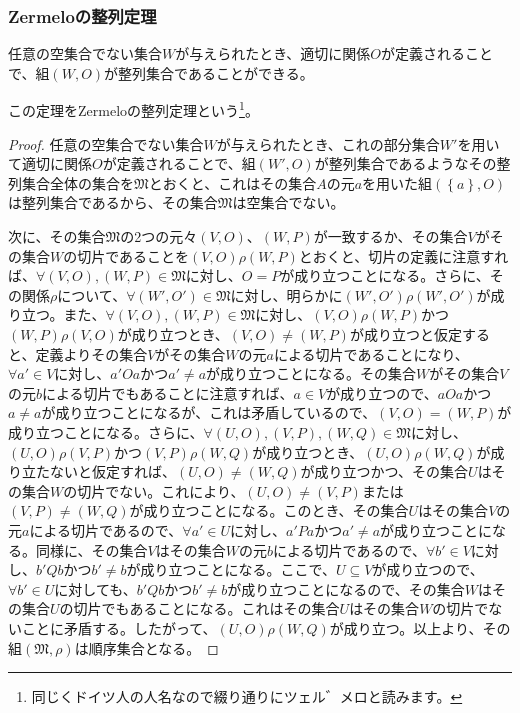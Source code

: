 \documentclass[dvipdfmx]{jsarticle}
\begin{document}
\subsubsection{Zermeloの整列定理}%
\begin{thm}[Zermeloの整列定理]\label{1.3.3.9}
任意の空集合でない集合$W$が与えられたとき、適切に関係$O$が定義されることで、組$(W,O)$が整列集合であることができる。
\end{thm}\par
この定理をZermeloの整列定理という\footnote{同じくドイツ人の人名なので綴り通りにツェル゛メロと読みます。}。
\begin{proof}
任意の空集合でない集合$W$が与えられたとき、これの部分集合$W'$を用いて適切に関係$O$が定義されることで、組$\left( W',O \right)$が整列集合であるようなその整列集合全体の集合を$\mathfrak{M}$とおくと、これはその集合$A$の元$a$を用いた組$\left( \left\{ a \right\},O \right)$は整列集合であるから、その集合$\mathfrak{M}$は空集合でない。\par
次に、その集合$\mathfrak{M}$の2つの元々$(V,O)$、$(W,P)$が一致するか、その集合$V$がその集合$W$の切片であることを$(V,O)\rho(W,P)$とおくと、切片の定義に注意すれば、$\forall(V,O),(W,P)\in \mathfrak{M}$に対し、$O = P$が成り立つことになる。さらに、その関係$\rho$について、$\forall\left( W',O' \right)\in \mathfrak{M}$に対し、明らかに$\left( W',O' \right)\rho\left( W',O' \right)$が成り立つ。また、$\forall(V,O),(W,P)\in \mathfrak{M}$に対し、$(V,O)\rho(W,P)$かつ$(W,P)\rho(V,O)$が成り立つとき、$(V,O) \neq (W,P)$が成り立つと仮定すると、定義よりその集合$V$がその集合$W$の元$a$による切片であることになり、$\forall a' \in V$に対し、$a'Oa$かつ$a' \neq a$が成り立つことになる。その集合$W$がその集合$V$の元$b$による切片でもあることに注意すれば、$a \in V$が成り立つので、$aOa$かつ$a \neq a$が成り立つことになるが、これは矛盾しているので、$(V,O) = (W,P)$が成り立つことになる。さらに、$\forall(U,O),(V,P),(W,Q)\in \mathfrak{M}$に対し、$(U,O)\rho(V,P)$かつ$(V,P)\rho(W,Q)$が成り立つとき、$(U,O)\rho(W,Q)$が成り立たないと仮定すれば、$(U,O) \neq (W,Q)$が成り立つかつ、その集合$U$はその集合$W$の切片でない。これにより、$(U,O) \neq (V,P)$または$(V,P) \neq (W,Q)$が成り立つことになる。このとき、その集合$U$はその集合$V$の元$a$による切片であるので、$\forall a' \in U$に対し、$a'Pa$かつ$a' \neq a$が成り立つことになる。同様に、その集合$V$はその集合$W$の元$b$による切片であるので、$\forall b' \in V$に対し、$b'Qb$かつ$b' \neq b$が成り立つことになる。ここで、$U \subseteq V$が成り立つので、$\forall b' \in U$に対しても、$b'Qb$かつ$b' \neq b$が成り立つことになるので、その集合$W$はその集合$U$の切片でもあることになる。これはその集合$U$はその集合$W$の切片でないことに矛盾する。したがって、$(U,O)\rho(W,Q)$が成り立つ。以上より、その組$\left( \mathfrak{M,}\rho \right)$は順序集合となる。\par

\end{proof}
\end{document}
